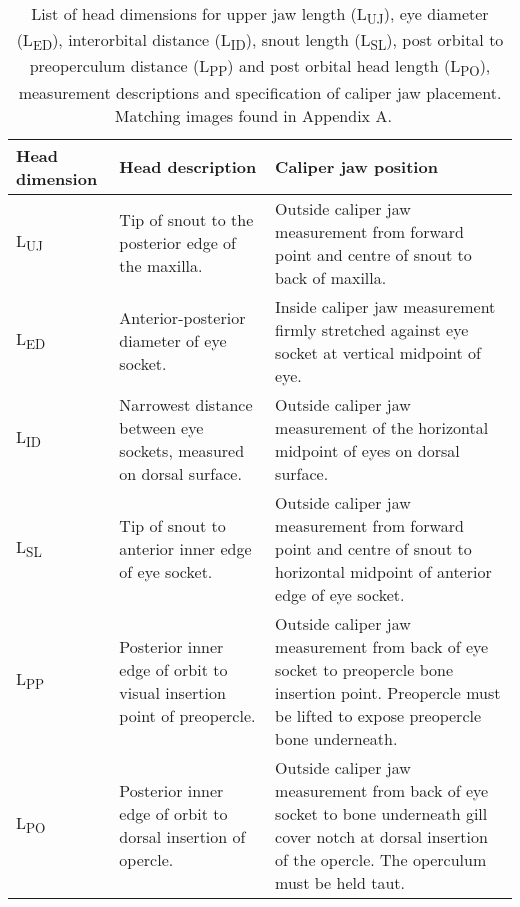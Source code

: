 \documentclass[12pt]{article}\usepackage[]{graphicx}\usepackage[]{color}
\begin{document}
\begin{table}[!h]

\caption{\label{tab:table1}List of head dimensions for upper jaw length (L\textsubscript{UJ}), eye diameter (L\textsubscript{ED}), interorbital distance (L\textsubscript{ID}), snout length (L\textsubscript{SL}), post orbital to preoperculum distance (L\textsubscript{PP}) and post orbital head length (L\textsubscript{PO}), measurement descriptions and specification of caliper jaw placement. Matching images found in Appendix A. ~\\
\hspace*{0.333em}\hspace*{0.333em}}
\fontsize{10}{12}\selectfont
\begin{tabular}[t]{>{\raggedright\arraybackslash}p{1.9cm}>{\raggedright\arraybackslash}p{6.0cm}>{\raggedright\arraybackslash}p{7.5cm}}
\toprule
\textbf{Head dimension} & \textbf{Head description} & \textbf{Caliper jaw position}\\
\midrule
L\textsubscript{UJ} & Tip of snout to the posterior edge of the maxilla. & Outside caliper jaw measurement from forward point and centre of snout to back of maxilla.\\
\midrule
L\textsubscript{ED} & Anterior-posterior diameter of eye socket. & Inside caliper jaw measurement firmly stretched against eye socket at vertical midpoint of eye.\\
\midrule
L\textsubscript{ID} & Narrowest distance between eye sockets, measured on dorsal surface. & Outside caliper jaw measurement of the horizontal midpoint of eyes on dorsal surface.\\
\midrule
L\textsubscript{SL} & Tip of snout to anterior inner edge of eye socket. & Outside caliper jaw measurement from forward point and centre of snout to horizontal midpoint of anterior edge of eye socket.\\
\midrule
L\textsubscript{PP} & Posterior inner edge of orbit to visual insertion point of preopercle. & Outside caliper jaw measurement from back of eye socket to preopercle bone insertion point. Preopercle must be lifted to expose preopercle bone underneath.\\
\midrule
L\textsubscript{PO} & Posterior inner edge of orbit to dorsal insertion of opercle. & Outside caliper jaw measurement from back of eye socket to bone underneath gill cover notch at dorsal insertion of the opercle.  The operculum must be held taut.\\
\bottomrule
\end{tabular}
\end{table}
~\\
\hspace*{0.333em}\\
\hspace*{0.333em}\\
\end{document}
